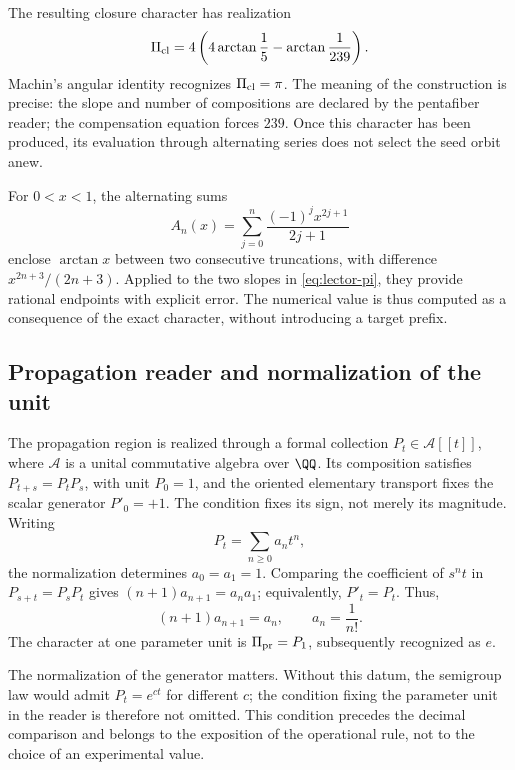 The resulting closure character has realization
\begin{equation}
 \Pi_{\rm cl}=4\left(4\arctan\frac15-\arctan\frac1{239}\right).
 \label{eq:lector-pi}
\end{equation}
Machin's angular identity recognizes \(\Pi_{\rm cl}=\pi\). The meaning of the construction is precise: the slope and number of compositions are declared by the pentafiber reader; the compensation equation forces \(239\). Once this character has been produced, its evaluation through alternating series does not select the seed orbit anew.

For \(0<x<1\), the alternating sums
\[
 A_n(x)=\sum_{j=0}^n\frac{(-1)^jx^{2j+1}}{2j+1}
\]
enclose \(\arctan x\) between two consecutive truncations, with difference \(x^{2n+3}/(2n+3)\). Applied to the two slopes in \eqref{eq:lector-pi}, they provide rational endpoints with explicit error. The numerical value is thus computed as a consequence of the exact character, without introducing a target prefix.

\subsection{Propagation reader and normalization of the unit}

The propagation region is realized through a formal collection \(P_t\in\mathcal A[[t]]\), where \(\mathcal A\) is a unital commutative algebra over \(\QQ\). Its composition satisfies \(P_{t+s}=P_tP_s\), with unit \(P_0=1\), and the oriented elementary transport fixes the scalar generator \(P'_0=+1\). The condition fixes its sign, not merely its magnitude. Writing
\[
 P_t=\sum_{n\ge0}a_nt^n,
\]
the normalization determines \(a_0=a_1=1\). Comparing the coefficient of \(s^nt\) in \(P_{s+t}=P_sP_t\) gives \((n+1)a_{n+1}=a_na_1\); equivalently, \(P'_t=P_t\). Thus,
\begin{equation}
 (n+1)a_{n+1}=a_n,\qquad a_n=\frac1{n!}.
 \label{eq:propagacion}
\end{equation}
The character at one parameter unit is \(\Pi_{\rm pr}=P_1\), subsequently recognized as \(e\).

The normalization of the generator matters. Without this datum, the semigroup law would admit \(P_t=e^{ct}\) for different \(c\); the condition fixing the parameter unit in the reader is therefore not omitted. This condition precedes the decimal comparison and belongs to the exposition of the operational rule, not to the choice of an experimental value.

